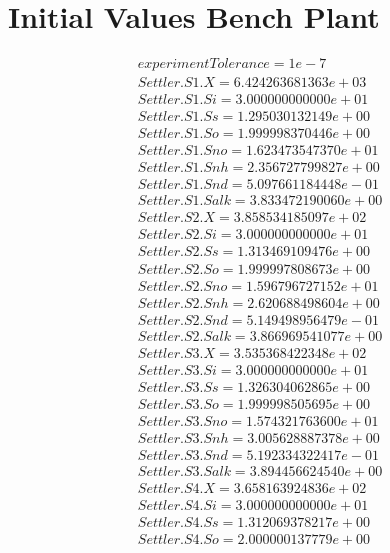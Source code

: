 \section{Initial Values Bench Plant}
\label{sec:AppendixC}
\begin{align*}
    experiment Tolerance=1e-7\\
    Settler.S1.X = 6.424263681363e+03\\
    Settler.S1.Si = 3.000000000000e+01\\
    Settler.S1.Ss = 1.295030132149e+00\\
    Settler.S1.So = 1.999998370446e+00\\
    Settler.S1.Sno = 1.623473547370e+01\\
    Settler.S1.Snh = 2.356727799827e+00\\
    Settler.S1.Snd = 5.097661184448e-01\\
    Settler.S1.Salk = 3.833472190060e+00\\
    Settler.S2.X = 3.858534185097e+02\\
    Settler.S2.Si = 3.000000000000e+01\\
    Settler.S2.Ss = 1.313469109476e+00\\
    Settler.S2.So = 1.999997808673e+00\\
    Settler.S2.Sno = 1.596796727152e+01\\
    Settler.S2.Snh = 2.620688498604e+00\\
    Settler.S2.Snd = 5.149498956479e-01\\
    Settler.S2.Salk = 3.866969541077e+00\\
    Settler.S3.X = 3.535368422348e+02\\
    Settler.S3.Si = 3.000000000000e+01\\
    Settler.S3.Ss = 1.326304062865e+00\\
    Settler.S3.So = 1.999998505695e+00\\
    Settler.S3.Sno = 1.574321763600e+01\\
    Settler.S3.Snh = 3.005628887378e+00\\
    Settler.S3.Snd = 5.192334322417e-01\\
    Settler.S3.Salk = 3.894456624540e+00\\
    Settler.S4.X = 3.658163924836e+02\\
    Settler.S4.Si = 3.000000000000e+01\\
    Settler.S4.Ss = 1.312069378217e+00\\
    Settler.S4.So = 2.000000137779e+00\\

\end{align*}
